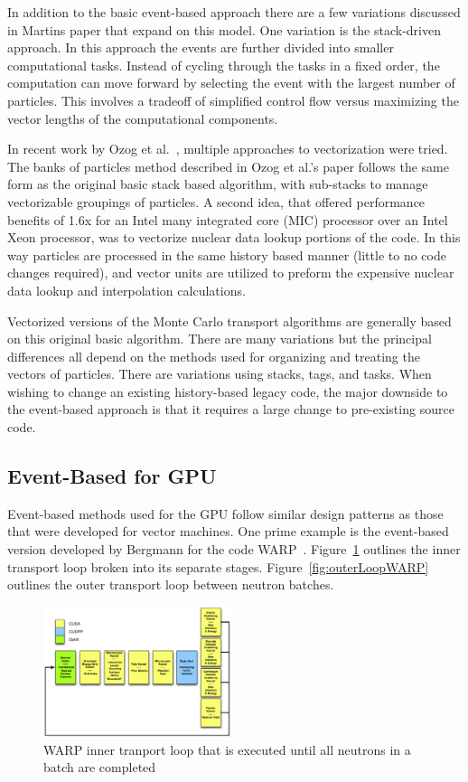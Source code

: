 In addition to the basic event-based approach there are a few variations discussed in Martins paper that expand on this model.
%
One variation is the stack-driven approach.
%
In this approach the events are further divided into smaller computational tasks.
%
Instead of cycling through the tasks in a fixed order, the computation can move forward by selecting the event with the largest number of particles.
%
This involves a tradeoff of simplified control flow versus maximizing the vector lengths of the computational components.
%

In recent work by Ozog et al.~\cite{ozog2015performance}, multiple approaches to vectorization were tried.
%
The banks of particles method described in Ozog et al.'s paper follows the same form as the original basic stack based algorithm, with sub-stacks to manage vectorizable groupings of particles.
%
A second idea, that offered performance benefits of 1.6x for an Intel many integrated core (MIC) processor over an Intel Xeon processor, was to vectorize nuclear data lookup portions of the code.
%
In this way particles are processed in the same history based manner (little to no code changes required), and vector units are utilized to preform the expensive nuclear data lookup and interpolation calculations.

%
Vectorized versions of the Monte Carlo transport algorithms are generally based on this original basic algorithm.
%
There are many variations but the principal differences all depend on the methods used for organizing and treating the vectors of particles.
%
There are variations using stacks, tags, and tasks.
%
When wishing to change an existing history-based legacy code, the major downside to the event-based approach is that it requires a large change to pre-existing source code.
%

\subsection*{\textbf{Event-Based for GPU}}

%
Event-based methods used for the GPU follow similar design patterns as those that were developed for vector machines.
%
One prime example is the event-based version developed by Bergmann for the code WARP~\cite{2014development}.
%
Figure~\ref{fig:innerLoopWARP} outlines the inner transport loop broken into its separate stages.
%
Figure~\ref{fig:outerLoopWARP} outlines the outer transport loop between neutron batches.
%

\begin{figure}
\includegraphics[width=0.49\textwidth]{InnerLoopWARP}
\caption{WARP inner tranport loop that is executed until all neutrons in a batch are completed~\cite{2014development}}
\label{fig:innerLoopWARP}
\end{figure}

